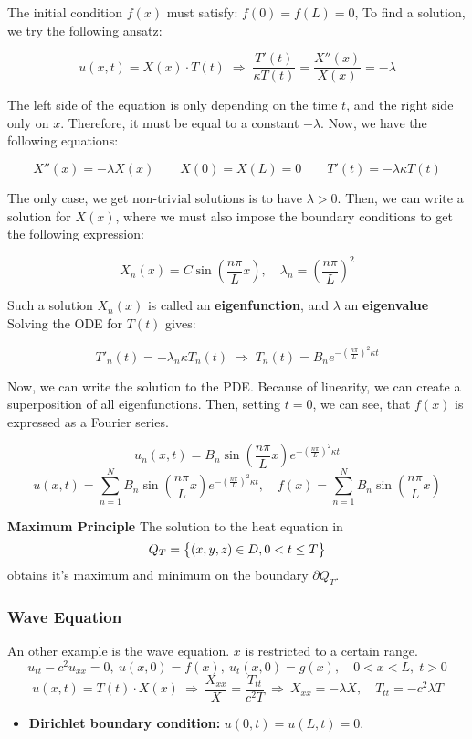 \documentclass[a4paper]{article}
\begin{document}
\begin{twocolumn}
The initial condition $f(x)$ must satisfy: $f(0) = f(L) = 0$,
To find a solution, we try the following ansatz:

$$u(x,t) = X(x) \cdot T(t) \; \Rightarrow \; \frac{T'(t)}{\kappa T(t)} = \frac{X''(x)}{X(x)} = -\lambda$$

The left side of the equation is only depending on the time $t$, and the right side only on $x$. Therefore, it must be equal to a constant $-\lambda$. Now, we have the following equations:

$$X''(x) = -\lambda X(x) \qquad X(0) = X(L) = 0 \qquad T'(t) = -\lambda \kappa T(t)$$

The only case, we get non-trivial solutions is to have $\lambda > 0$. Then, we can write a solution for $X(x)$, where we must also impose the boundary conditions to get the following expression:

$$X_n(x) = C \sin\left(\frac{n \pi}{L} x\right), \quad \lambda_n = \left(\frac{n\pi}{L}\right)^2$$

Such a solution $X_n(x)$ is called an \textbf{eigenfunction}, and $\lambda$ an \textbf{eigenvalue}
Solving the ODE for $T(t)$ gives:

$$T'_n(t) = -\lambda_n \kappa T_n(t) \; \Rightarrow \; T_n(t) = B_n e^{-\left(\frac{n\pi}{L}\right)^2 \kappa t}$$

Now, we can write the solution to the PDE. 
Because of linearity, we can create a superposition of all eigenfunctions. 
Then, setting $t=0$, we can see, that $f(x)$ is expressed as a Fourier series.

$$u_n(x,t) = B_n \sin \left(\frac{n \pi}{L} x\right) e^{-\left(\frac{n\pi}{L}\right)^2 \kappa t}$$
$$u(x,t) = \sum_{n=1}^{N}B_n \sin \left(\frac{n\pi}{L} x \right) e^{-\left(\frac{n \pi}{L}\right)^2 \kappa t}, \quad f(x) = \sum_{n=1}^{N} B_n \sin \left(\frac{n\pi}{L} x \right)$$

\textbf{Maximum Principle} The solution to the heat equation in 
$$Q_T = \begin{set}{(x,y,z) \in D, 0 < t \leq T}\end{set}$$
obtains it's maximum and minimum on the boundary $\partial Q_T$.

\subsubsection{Wave Equation}

An other example is the wave equation. $x$ is restricted to a certain range. 
$$u_{tt} - c^2 u_{xx} = 0, \  u(x,0) = f(x), \ u_t(x,0) = g(x), \quad 0 < x < L, \; t > 0$$
$$u(x,t) = T(t) \cdot X(x) \ \Rightarrow \ \frac{X_{xx}}{X} = \frac{T_{tt}}{c^2T} \ \Rightarrow \ X_{xx} = -\lambda X, \quad T_{tt} = -c^2 \lambda T$$
\begin{itemize}
	\item \textbf{Dirichlet boundary condition:} $u(0,t) = u(L,t) = 0$.
	

\end{itemize}
\end{twocolumn}
\end{document}
